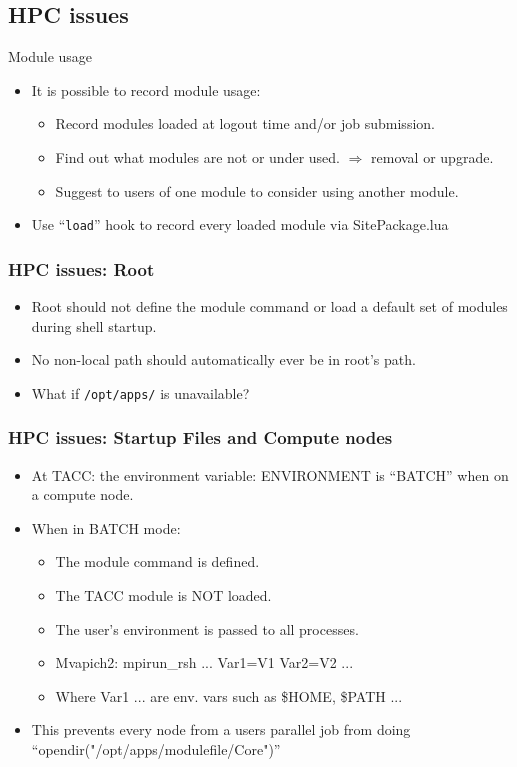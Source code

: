 \documentclass{beamer}
\begin{document}
\subsection{HPC issues}

\begin{frame}{Module usage}
  \begin{itemize}
    \item It is possible to record module usage:
      \begin{itemize}
        \item Record modules loaded at logout time and/or job submission.
        \item Find out what modules are not or under used.
          $\Rightarrow$ removal or upgrade.
        \item Suggest to users of one module to consider using another module.
      \end{itemize}
    \item Use ``\texttt{load}'' hook to record every loaded module via SitePackage.lua
  \end{itemize}
\end{frame}


\begin{frame}[fragile]
    \frametitle{HPC issues: Root}
  \begin{itemize}
    \item Root should not define the module command or load a default
      set of modules during shell startup.
    \item No non-local path should automatically ever be in root's path.
    \item What if \texttt{/opt/apps/} is unavailable?
  \end{itemize}
\end{frame}

\begin{frame}[fragile]
    \frametitle{HPC issues: Startup Files and Compute nodes}
  \begin{itemize}
    \item At TACC: the environment variable: ENVIRONMENT is ``BATCH'' when on a compute node.
    \item When in BATCH mode:
      \begin{itemize}
        \item The module command is defined.
        \item The TACC module is NOT loaded.
        \item The user's environment is passed to all processes.
        \item Mvapich2: mpirun\_rsh ... {\color{blue}Var1}={\color{blue}V1} {\color{blue}Var2}={\color{blue}V2} ...
        \item Where {\color{blue}Var1} ... are env. vars such as
          \$HOME, \$PATH ...
      \end{itemize}
    \item This prevents every node from a users parallel job from
      doing ``opendir("/opt/apps/modulefile/Core")''
  \end{itemize}
\end{frame}
\end{document}
